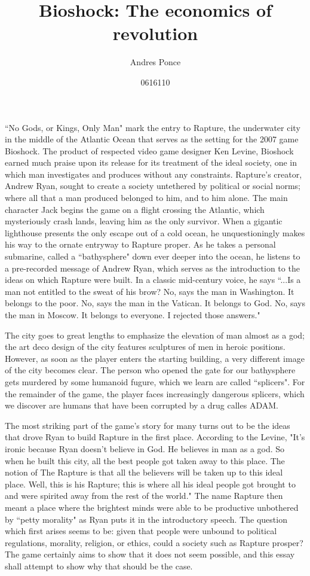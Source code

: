 \documentclass{article}
\title{Bioshock: The economics of revolution}
\author{Andres Ponce \\
\and
0616110
}
\begin{document}
\maketitle
``No Gods, or Kings, Only Man"\textcite{Bioshock} mark the entry to Rapture, the underwater city in the middle 
of the Atlantic Ocean
that serves as the setting for the 2007 game Bioshock. 
The product of respected video game designer Ken Levine, Bioshock earned much praise upon
its release for its treatment of the ideal society, one in which man investigates and produces without any 
constraints. Rapture's creator, Andrew Ryan, sought to create a society untethered by political or social 
norms; where all that a man produced belonged to him, and to him alone. The main character Jack begins the 
game on a flight crossing the Atlantic, which mysteriously crash lands, leaving him as the only survivor.
When a gigantic lighthouse presents the only escape out of a cold ocean, he unquestioningly makes his way
to the ornate entryway to Rapture proper. As he takes a personal submarine, called a ``bathysphere" down 
ever deeper into the ocean, he listens to a pre-recorded message of Andrew Ryan, which serves as the 
introduction to the ideas on which Rapture were built. In a classic mid-century voice, he says ``...Is a man
not entitled to the sweat of his brow? No, says the man in Washington. It belongs to the poor. No, says the 
man in the Vatican. It belongs to God. No, says the man in Moscow. It belongs to everyone. I rejected those
answers."\textcite{Bioshock}

The city goes to great lengths to emphasize the elevation of man almost as a god; the art deco design of the
city features sculptures of men in heroic positions. However, as soon as the player enters the starting 
building, a very different image of the city becomes clear. The person who opened the gate for our bathysphere
gets murdered by some humanoid fugure, which we learn are called ``splicers". For the remainder of the game, 
the player faces increasingly dangerous splicers, which we discover are humans that have been corrupted by 
a drug calles ADAM.

The most striking part of the game's story for many turns out to be the ideas that drove Ryan to build Rapture
in the first place. According to the Levine, "It's ironic because Ryan doesn't believe in God. He believes 
in man as a god. So when he built this city, all the best people got taken away to this place. The notion of 
The Rapture is that all the believers will be taken up to this ideal place. Well, this is his Rapture; this is
where all his ideal people got brought to and were spirited away from the rest of the world."
\textcite{LevineInterview} The name Rapture then meant a place where the brightest minds were able to 
be productive unbothered by ``petty morality" as Ryan  puts it in the introductory speech.  The question 
which first arises seems to be: given that people were unbound to political regulations, morality, religion,
or ethics, could a society such as Rapture prosper? The game certainly aims to show that it does not seem 
possible, and this essay shall attempt to show why that should be the case. 
\end{document}
